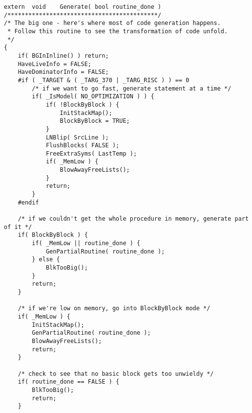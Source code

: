 \begin{lstlisting}[caption=blg\textbackslash{}cg\textbackslash{}c\textbackslash{}generate.c]
extern  void    Generate( bool routine_done )
/*******************************************/
/* The big one - here's where most of code generation happens.
 * Follow this routine to see the transformation of code unfold.
 */
{
    if( BGInInline() ) return;
    HaveLiveInfo = FALSE;
    HaveDominatorInfo = FALSE;
    #if ( _TARGET & ( _TARG_370 | _TARG_RISC ) ) == 0
        /* if we want to go fast, generate statement at a time */
        if( _IsModel( NO_OPTIMIZATION ) ) {
            if( !BlockByBlock ) {
                InitStackMap();
                BlockByBlock = TRUE;
            }
            LNBlip( SrcLine );
            FlushBlocks( FALSE );
            FreeExtraSyms( LastTemp );
            if( _MemLow ) {
                BlowAwayFreeLists();
            }
            return;
        }
    #endif

    /* if we couldn't get the whole procedure in memory, generate part of it */
    if( BlockByBlock ) {
        if( _MemLow || routine_done ) {
            GenPartialRoutine( routine_done );
        } else {
            BlkTooBig();
        }
        return;
    }

    /* if we're low on memory, go into BlockByBlock mode */
    if( _MemLow ) {
        InitStackMap();
        GenPartialRoutine( routine_done );
        BlowAwayFreeLists();
        return;
    }

    /* check to see that no basic block gets too unwieldy */
    if( routine_done == FALSE ) {
        BlkTooBig();
        return;
    }


\end{lstlisting}
